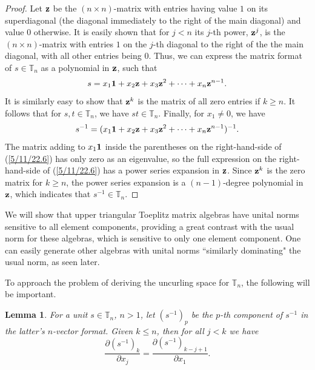 \documentclass{amsart}
\numberwithin{equation}{section}
\newtheorem{lemma}[theorem]{Lemma}
\theoremstyle{definition}
\numberwithin{theorem}{section}
\begin{document}
 \begin{proof}
Let ${\bf z}$ be the $(n \times n)$-matrix with entries having value $1$ on its superdiagonal  (the diagonal immediately to the right of the main diagonal) and value $0$ otherwise.  It is easily shown that for $j<n$ its $j$-th power, ${\bf z}^j$, is the $(n\times n)$-matrix with entries $1$ on the $j$-th diagonal to the right of the the main diagonal, with all other entries being $0$.   Thus, we can express the matrix format of $s\in\mathbb{T}_n$ as a polynomial in ${\bf z}$, such that
\begin{equation}\label{5/11/22.5} s = x_1 {\bf 1} + x_2 {\bf z} + x_3 {\bf z}^2 + \cdots + x_n {\bf z}^{n-1}.\end{equation}  It is similarly easy to show that ${\bf z}^k$ is the matrix of all zero entries if $k\ge n$.  It follows that for $s,t\in \mathbb{T}_n$, we have $st\in \mathbb{T}_n$.   Finally, for $x_1\ne 0$, we have \begin{equation}\label{5/11/22.6} s^{-1} =  (x_1 {\bf 1} + x_2 {\bf z} + x_3 {\bf z}^2 + \cdots + x_n {\bf z}^{n-1})^{-1}.\end{equation}  The matrix adding to $x_1{\bf 1}$ inside the parentheses on the right-hand-side of (\ref{5/11/22.6}) has only zero as an eigenvalue, so the full expression on the right-hand-side of (\ref{5/11/22.6}) has a power series expansion in ${\bf z}$.  Since ${\bf z}^k$ is the zero matrix for $k\ge n$, the power series expansion is  a $(n-1)$-degree polynomial in ${\bf z}$, which indicates that $s^{-1}\in \mathbb{T}_n$.
 \end{proof}
 
We will show that upper triangular Toeplitz matrix algebras have unital norms sensitive to all element components, providing a great contrast with the usual norm for these algebras, which is sensitive to only one element component.  One can easily generate other algebras with unital norms ``similarly dominating" the usual norm, as seen later.

To approach the problem of deriving the uncurling space for $\mathbb{T}_n$, the following will be important.

\begin{lemma} \label{5/7/22.15} For a unit $s\in \mathbb{T}_n$,  $n>1$, let $\left( s^{-1} \right)_p$ be the $p$-th component of $s^{-1}$ in the latter's $n$-vector format.  Given $k\le n$, then for all $j<k$ we have \begin{equation}\label{5/6/22.10} \frac{\partial \left( s^{-1} \right)_k}{\partial x_j} = \frac{\partial \left( s^{-1} \right)_{k-j+1}}{\partial x_1}.\end{equation}
\end{lemma}
\end{document}
